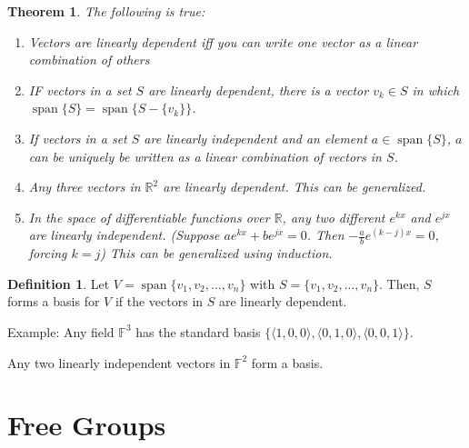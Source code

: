 \documentclass{article}
\theoremstyle{definition}
\newtheorem{definition}{Definition}
\theoremstyle{plain}
\newtheorem{theorem}{Theorem}
\theoremstyle{corollary}
\theoremstyle{lemma}
\DeclareMathOperator{\vspan}{span}
\begin{document}
\begin{theorem}
    The following is true:
    \begin{enumerate}
        \item Vectors are linearly dependent iff you can write one vector as a linear combination of others
        \item IF vectors in a set $S$ are linearly dependent, there is a vector $v_k\in S$ in which $\vspan\{S\}=\vspan\{S-\{v_k\}\}$.
        \item If vectors in a set $S$ are linearly independent and an element $a\in\vspan\{S\}$, $a$ can be uniquely be written as a linear combination of vectors in $S$.
        \item Any three vectors in $\mathbb{R}^2$ are linearly dependent. This can be generalized.
        \item In the space of differentiable functions over $\mathbb{R}$, any two different $e^{kx}$ and $e^{jx}$ are linearly independent. (Suppose $ae^{kx}+be^{jx}=0$. Then $-\frac a be^{(k-j)x}=0$, forcing $k=j$) This can be generalized using induction.
    \end{enumerate}
\end{theorem}

\begin{definition}
    Let $V=\vspan\{v_1,v_2,...,v_n\}$ with $S=\{v_1,v_2,...,v_n\}$. Then, $S$ forms a basis for $V$ if the vectors in $S$ are linearly dependent.
\end{definition}

Example: Any field $\mathbb{F}^3$ has the standard basis $\{\langle1,0,0\rangle,\langle0,1,0\rangle,\langle0,0,1\rangle\}$.

Any two linearly independent vectors in $\mathbb{F}^2$ form a basis. 










\section{Free Groups}



\end{document}
